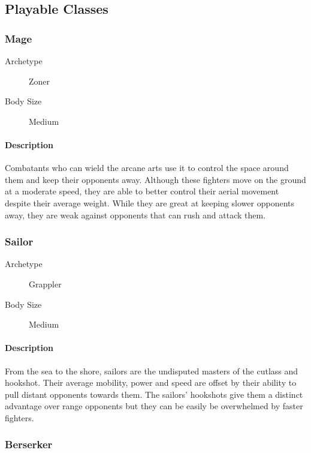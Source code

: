 \subsection{Playable Classes}

\subsubsection{Mage}

\begin{description}
    \item[Archetype] Zoner
    \item[Body Size] Medium
\end{description}

\paragraph{Description} Combatants who can wield the arcane arts use it to control the space around them and keep their opponents away. Although these fighters move on the ground at a moderate speed, they are able to better control their aerial movement despite their average weight. While they are great at keeping slower opponents away, they are weak against opponents that can rush and attack them.

\subsubsection{Sailor}

\begin{description}
    \item[Archetype] Grappler
    \item[Body Size] Medium
\end{description}

\paragraph{Description} From the sea to the shore, sailors are the undisputed masters of the cutlass and hookshot. Their average mobility, power and speed are offset by their ability to pull distant opponents towards them. The sailors' hookshots give them a distinct advantage over range opponents but they can be easily be overwhelmed by faster fighters.

\subsubsection{Berserker}

